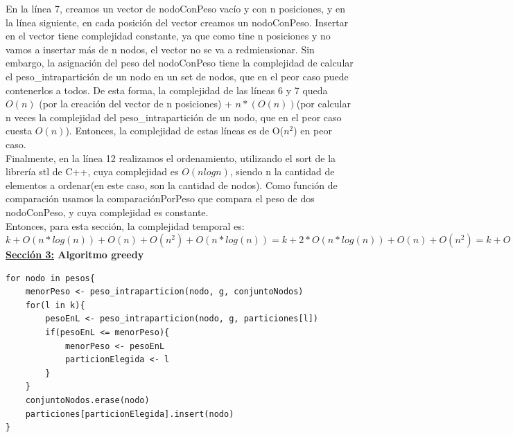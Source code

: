 \documentclass[10pt,a4paper]{article}
\begin{document}
En la línea 7, creamos un vector de nodoConPeso vacío y con n posiciones, y en la línea siguiente, en cada posición del vector creamos un nodoConPeso. Insertar en el vector tiene complejidad constante, ya que como tine n posiciones y no vamos a insertar más de n nodos, el vector no se va a redmiensionar. Sin embargo, la asignación del peso del nodoConPeso tiene la complejidad de calcular el peso\_intrapartición de un nodo en un set de nodos, que en el peor caso puede contenerlos a todos. De esta forma, la complejidad de las líneas 6 y 7 queda $O(n)$ (por la creación del vector de n posiciones) + $n*(O(n))$(por calcular n veces la complejidad del peso\_intrapartición de un nodo, que en el peor caso cuesta $O(n)$). Entonces, la complejidad de estas líneas es de O($n^2$) en peor caso.\\
Finalmente, en la línea 12 realizamos el ordenamiento, utilizando el sort de la librería stl de C++, cuya complejidad es $O(n log n)$, siendo n la cantidad de elementos a ordenar(en este caso, son la cantidad de nodos). Como función de comparación usamos la comparaciónPorPeso que compara el peso de dos nodoConPeso, y cuya complejidad es constante.\\
Entonces, para esta sección, la complejidad temporal es:\\
$k + O(n*log(n))+O(n)+ O(n^2)+O(n*log(n)) = k + 2*O(n*log(n)) + O(n) + O(n^2) = k +  O(n^2)$\\

\textbf{\underline{Sección 3:} Algoritmo greedy}

\begin{lstlisting}[mathescape]
for nodo in pesos{
	menorPeso <- peso_intraparticion(nodo, g, conjuntoNodos)
	for(l in k){
		pesoEnL <- peso_intraparticion(nodo, g, particiones[l])
		if(pesoEnL <= menorPeso){
			menorPeso <- pesoEnL
			particionElegida <- l
		}
	}
	conjuntoNodos.erase(nodo)
	particiones[particionElegida].insert(nodo)
}
\end{lstlisting}
\end{document}
